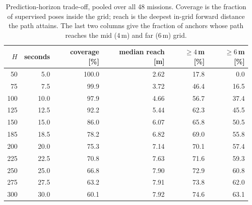 \begin{table}[htbp]
\caption{Prediction-horizon trade-off, pooled over all 48 missions. Coverage is the fraction of supervised poses inside the grid; reach is the deepest in-grid forward distance the path attains. The last two columns give the fraction of anchors whose path reaches the mid (4\,m) and far (6\,m) grid.}
\label{tab:horizon}
\begin{tabular}{rrrrrr}
\toprule
$H$ & seconds & coverage [\%] & median reach [m] & $\ge 4$\,m [\%] & $\ge 6$\,m [\%] \\
\midrule
50 & 5.0 & 100.0 & 2.62 & 17.8 & 0.0 \\
75 & 7.5 & 99.9 & 3.72 & 46.4 & 16.5 \\
100 & 10.0 & 97.9 & 4.66 & 56.7 & 37.4 \\
125 & 12.5 & 92.2 & 5.44 & 62.3 & 45.5 \\
150 & 15.0 & 86.0 & 6.07 & 65.8 & 50.5 \\
185 & 18.5 & 78.2 & 6.82 & 69.0 & 55.8 \\
200 & 20.0 & 75.3 & 7.14 & 70.1 & 57.4 \\
225 & 22.5 & 70.8 & 7.63 & 71.6 & 59.3 \\
250 & 25.0 & 66.8 & 7.90 & 72.9 & 60.8 \\
275 & 27.5 & 63.2 & 7.91 & 73.8 & 62.0 \\
300 & 30.0 & 60.1 & 7.92 & 74.6 & 63.1 \\
\bottomrule
\end{tabular}
\end{table}
